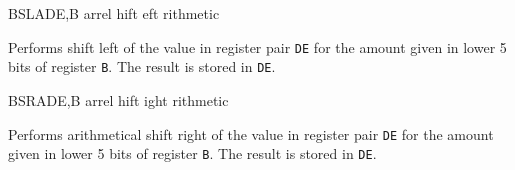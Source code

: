 \begin{basedescript}{
	\desclabelstyle{\multilinelabel}
	\desclabelwidth{3cm}}
	\begin{DetailItem}{BSLA}{DE,B\ZXN}
		{arrel hift eft rithmetic}
		{\SymBSLA}

		Performs shift left of the value in register pair {\tt DE} for the amount given in lower 5 bits of register {\tt B}. The result is stored in {\tt DE}.

		\begin{DetailEffects}
			\FlagsBSLA
		\end{DetailEffects}
		
		\begin{DetailTiming}
			\DetailTime{2}{8}
		\end{DetailTiming}

	\end{DetailItem}


	\begin{DetailItem}{BSRA}{DE,B\ZXN}
		{arrel hift ight rithmetic}
		{\SymBSRA}

		Performs arithmetical shift right of the value in register pair {\tt DE} for the amount given in lower 5 bits of register {\tt B}. The result is stored in {\tt DE}.

		\begin{DetailEffects}
			\FlagsBSRA
		\end{DetailEffects}
		
		\begin{DetailTiming}
		\end{DetailTiming}

	\end{DetailItem}

	\pagebreak



\end{basedescript}
